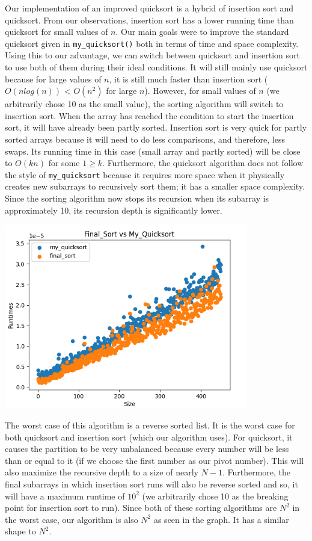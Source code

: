 \documentclass{article}
\begin{document}
Our implementation of an improved quicksort is a hybrid of insertion sort and quicksort. From our observations, insertion sort has a lower running time than quicksort for small values of $n$. Our main goals were to improve the standard quicksort given in \verb|my_quicksort()| both in terms of time and space complexity. Using this to our advantage, we can switch between quicksort and insertion sort to use both of them during their ideal conditions. It will still mainly use quicksort because for large values of $n$, it is still much faster than insertion sort ($O(nlog(n))$ < $O(n^2)$ for large $n$). However, for small values of $n$ (we arbitrarily chose 10 as the small value), the sorting algorithm will switch to insertion sort. When the array has reached the condition to start the insertion sort, it will have already been partly sorted. Insertion sort is very quick for partly sorted arrays because it will need to do less comparisons, and therefore, less swaps. Its running time in this case (small array and partly sorted) will be close to $O(kn)$ for some $1 \geq k$. Furthermore, the quicksort algorithm does not follow the style of \verb|my_quicksort| because it requires more space when it physically creates new subarrays to recursively sort them; it has a smaller space complexity. Since the sorting algorithm now stops its recursion when its subarray is approximately 10,  its recursion depth is significantly lower. 

\includegraphics[width=0.8\textwidth]{quicksortFinalSort}

The worst case of this algorithm is a reverse sorted list. It is the worst case for both quicksort and insertion sort (which our algorithm uses). For quicksort, it causes the partition to be very unbalanced because every number will be less than or equal to it (if we choose the first number as our pivot number). This will also maximize the recursive depth to a size of nearly $N-1$. Furthermore, the final subarrays in which insertion sort runs will also be reverse sorted and so, it will have a maximum runtime of $10^2$ (we arbitrarily chose 10 as the breaking point for insertion sort to run). Since both of these sorting algorithms are $N^2$ in the worst case, our algorithm is also $N^2$ as seen in the graph. It has a similar shape to $N^2$.
\end{document}
